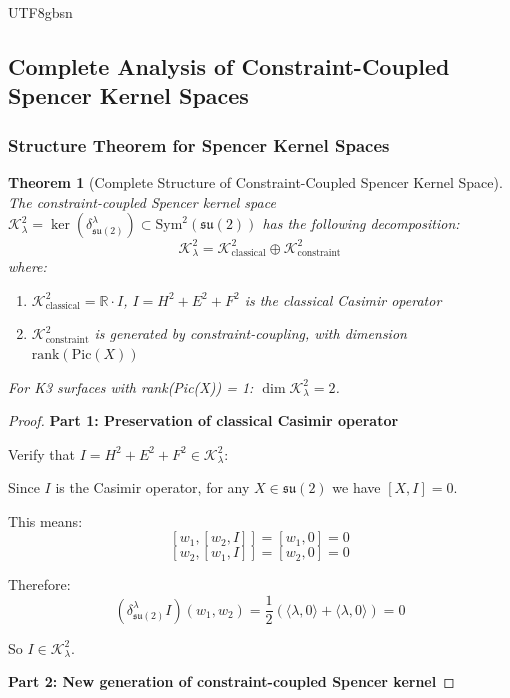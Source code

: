 \documentclass[a4paper,12pt]{extarticle}
\newtheorem{theorem}{Theorem}[section]
\theoremstyle{definition}
\begin{document}
\begin{CJK}{UTF8}{gbsn}
\subsection{Complete Analysis of Constraint-Coupled Spencer Kernel Spaces}
\label{subsec:constraint_coupled_spencer_kernel}

\subsubsection{Structure Theorem for Spencer Kernel Spaces}
\label{subsubsec:spencer_kernel_structure}

\begin{theorem}[Complete Structure of Constraint-Coupled Spencer Kernel Space]
\label{thm:constraint_spencer_kernel_structure}
The constraint-coupled Spencer kernel space $\mathcal{K}^2_\lambda = \ker(\delta^\lambda_{\mathfrak{su}(2)}) \subset \text{Sym}^2(\mathfrak{su}(2))$ has the following decomposition:
$$\mathcal{K}^2_\lambda = \mathcal{K}^2_{\text{classical}} \oplus \mathcal{K}^2_{\text{constraint}}$$
where:
\begin{enumerate}
\item $\mathcal{K}^2_{\text{classical}} = \mathbb{R} \cdot I$, $I = H^2 + E^2 + F^2$ is the classical Casimir operator
\item $\mathcal{K}^2_{\text{constraint}}$ is generated by constraint-coupling, with dimension $\text{rank}(\text{Pic}(X))$
\end{enumerate}

For K3 surfaces with rank(Pic(X)) = 1: $\dim \mathcal{K}^2_\lambda = 2$.
\end{theorem}

\begin{proof}
\textbf{Part 1: Preservation of classical Casimir operator}

Verify that $I = H^2 + E^2 + F^2 \in \mathcal{K}^2_\lambda$:

Since $I$ is the Casimir operator, for any $X \in \mathfrak{su}(2)$ we have $[X, I] = 0$.

This means:
$$[w_1, [w_2, I]] = [w_1, 0] = 0$$
$$[w_2, [w_1, I]] = [w_2, 0] = 0$$

Therefore:
$$(\delta^\lambda_{\mathfrak{su}(2)}I)(w_1, w_2) = \frac{1}{2}(\langle\lambda, 0\rangle + \langle\lambda, 0\rangle) = 0$$

So $I \in \mathcal{K}^2_\lambda$.

\textbf{Part 2: New generation of constraint-coupled Spencer kernel}


\end{proof}
\end{CJK}
\end{document}
